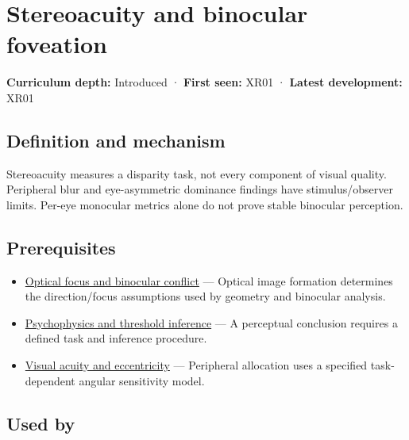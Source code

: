 \hypertarget{appendix-8dc848f14052}{}\label{referencestart:appendix-8dc848f14052}
\section{Stereoacuity and binocular foveation}\label{appendix-8dc848f14052-stereoacuity-and-binocular-foveation}

\textbf{Curriculum depth:} Introduced · \textbf{First seen:} XR01 · \textbf{Latest development:} XR01

\begin{allmightroledefinition}

\subsection{Definition and mechanism}\label{appendix-8dc848f14052-definition-and-mechanism}

Stereoacuity measures a disparity task, not every component of visual quality. Peripheral blur and eye-asymmetric dominance findings have stimulus/observer limits. Per-eye monocular metrics alone do not prove stable binocular perception.

\end{allmightroledefinition}

\subsection{Prerequisites}\label{appendix-8dc848f14052-prerequisites}

\begin{itemize}
\tightlist
\item
  \hyperref[appendix-f90cee1be7a4]{Optical focus and binocular conflict} --- Optical image formation determines the direction/focus assumptions used by geometry and binocular analysis.
\item
  \hyperref[appendix-1759f03e8ce7]{Psychophysics and threshold inference} --- A perceptual conclusion requires a defined task and inference procedure.
\item
  \hyperref[appendix-b491fc48c54b]{Visual acuity and eccentricity} --- Peripheral allocation uses a specified task-dependent angular sensitivity model.
\end{itemize}

\subsection{Used by}\label{appendix-8dc848f14052-used-by}

